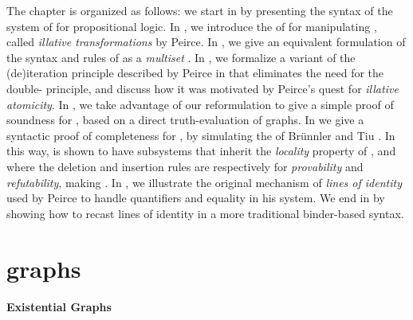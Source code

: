 \begin{scope}
The chapter is organized as follows: we start in  by presenting
the  syntax of the system  of  for
 propositional logic. In , we introduce the
 of  for manipulating ,
called \emph{illative transformations} by Peirce. In , we give
an equivalent formulation of the syntax and rules of  as a
\emph{multiset} . In , we formalize a
variant of the (de)iteration principle described by Peirce in
 that eliminates the need for the
double- principle, and discuss how it was motivated by Peirce's quest
for \emph{illative atomicity}. In , we take advantage of
our reformulation to give a simple proof of soundness for , based on a
direct truth-evaluation of graphs. In  we give a
syntactic proof of completeness for , by simulating the   of Brünnler and Tiu .
In this way,  is shown to have subsystems that inherit the
\emph{locality} property of , and where the deletion and insertion rules
are respectively  for \emph{provability} and \emph{refutability},
making  \emph{}. In , we illustrate the
original mechanism of \emph{lines of identity} used by Peirce to handle
quantifiers and equality in his  system. We end in  by
showing how to recast lines of identity in a more traditional binder-based
syntax.


\section{ graphs}

\paragraph{Existential Graphs}


\end{scope}
